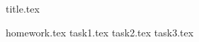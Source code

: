 \documentclass[final]{scrreprt} %
\begin{document}

{title.tex}

\newpage

\tableofcontents

\newpage
{}
{homework.tex}
{task1.tex}
{task2.tex}
{task3.tex}
\newpage
{}

\printbibliography
\end{document}
